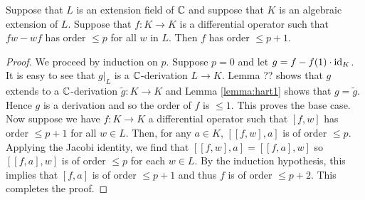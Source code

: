 \begin{corollary}
    Suppose that $L$ is an extension field of $\mathbb{C}$ and suppose that $K$ is an algebraic
    extension of $L$. Suppose that $f:K\to K$ is a differential operator such that $fw-wf$
    has order $\leqslant p$ for all $w$ in $L$. Then $f$ has order $\leqslant p+1$.
\end{corollary}
\begin{proof}
    We proceed by induction on $p$. Suppose $p=0$ and let $g=f - f(1)\cdot\operatorname{id}_K$. It is easy
    to see that $g|_L$ is a $\mathbb{C}$-derivation $L\to K$. Lemma ?? shows that $g$ extends to a
    $\mathbb{C}$-derivation $\tilde g:K\to K$ and Lemma \ref{lemma:hart1} shows that $g=\tilde g$.
    Hence $g$ is a derivation and so the order of $f$ is $\leqslant 1$.
    This proves the base case. Now suppose we have $f:K\to K$ a differential operator
    such that $[f,w]$ has order $\leqslant p+1$ for all $w\in L$. Then, for any $a\in K$,
    $[ [f,w],a]$ is of order $\leqslant p$. Applying the Jacobi identity, we find that
    $[ [f,w], a] = [ [f,a], w]$
    so $[ [f,a], w]$ is of order $\leqslant p$ for each $w\in L$. By the induction hypothesis,
    this implies that $[f,a]$ is of order $\leqslant p+1$ and thus $f$ is of order $\leqslant p+2$.
    This completes the proof.
\end{proof}

